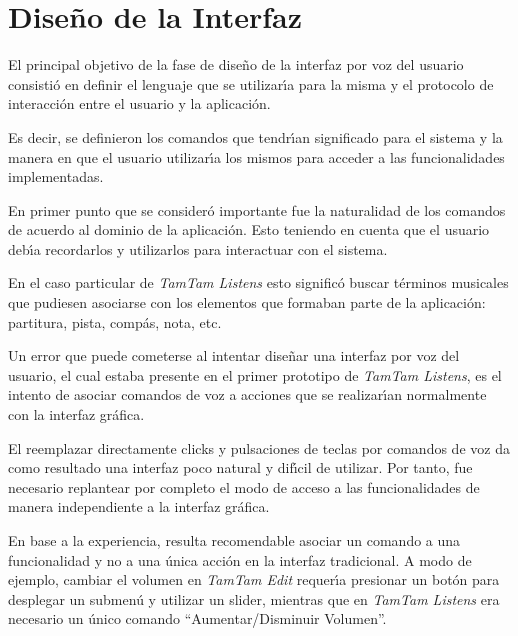 \section{Dise\~no de la Interfaz}
\label{sec:disenho-interfaz}

El principal objetivo de la fase de dise\~no de la interfaz por voz del usuario consisti\'o
en definir el lenguaje que se utilizar{\'\i}a para la misma y el protocolo de interacci\'on entre
el usuario y la aplicaci\'on.

Es decir, se definieron los comandos que tendr{\'\i}an significado para el sistema y la manera
en que el usuario utilizar{\'\i}a los mismos para acceder a las funcionalidades implementadas.

En primer punto que se consider\'o importante fue la naturalidad de los comandos
de acuerdo al dominio de la aplicaci\'on. Esto teniendo en cuenta que el usuario deb{\'\i}a
recordarlos y utilizarlos para interactuar con el sistema.

En el caso particular de \emph{TamTam Listens} esto signific\'o buscar t\'erminos musicales
que pudiesen asociarse con los elementos que formaban parte de la aplicaci\'on: partitura,
pista, comp\'as, nota, etc.

Un error que puede cometerse al intentar dise\~nar una interfaz por voz del usuario,
el cual estaba presente en el primer prototipo de \emph{TamTam Listens}, es el intento
de asociar comandos de voz a acciones que se realizar{\'\i}an normalmente con la interfaz
gr\'afica.

El reemplazar directamente clicks y pulsaciones de teclas por comandos de voz da
como resultado una interfaz poco natural y dif{\'\i}cil de utilizar. Por tanto, fue
necesario replantear por completo el modo de acceso a las funcionalidades de manera
independiente a la interfaz gr\'afica.

En base a la experiencia, resulta recomendable asociar un comando a una funcionalidad
y no a una \'unica acci\'on en la interfaz tradicional. A modo de ejemplo, cambiar el
volumen en \emph{TamTam Edit} requer{\'\i}a presionar un bot\'on para desplegar un submen\'u 
y utilizar un {slider}, mientras que en \emph{TamTam Listens} era necesario un
\'unico comando ``Aumentar/Disminuir Volumen''.  